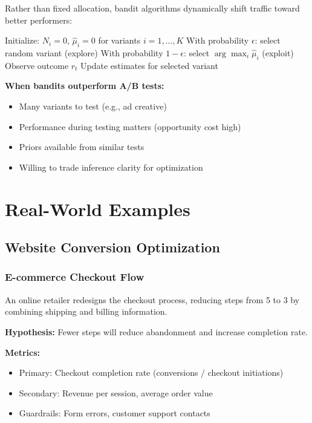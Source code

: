 Rather than fixed allocation, bandit algorithms dynamically shift traffic toward better performers:

\begin{algorithm}[H]
\caption{Simple $\epsilon$-Greedy Bandit}
\begin{algorithmic}
\STATE Initialize: $N_i = 0$, $\hat{\mu}_i = 0$ for variants $i = 1, \ldots, K$
    \STATE With probability $\epsilon$: select random variant (explore)
    \STATE With probability $1-\epsilon$: select $\arg\max_i \hat{\mu}_i$ (exploit)
    \STATE Observe outcome $r_t$
    \STATE Update estimates for selected variant
\ENDFOR
\end{algorithmic}
\end{algorithm}

\textbf{When bandits outperform A/B tests:}
\begin{itemize}
    \item Many variants to test (e.g., ad creative)
    \item Performance during testing matters (opportunity cost high)
    \item Priors available from similar tests
    \item Willing to trade inference clarity for optimization
\end{itemize}

\section{Real-World Examples}

\subsection{Website Conversion Optimization}

\subsubsection{E-commerce Checkout Flow}

An online retailer redesigns the checkout process, reducing steps from 5 to 3 by combining shipping and billing information.

\textbf{Hypothesis:} Fewer steps will reduce abandonment and increase completion rate.

\textbf{Metrics:}
\begin{itemize}
    \item Primary: Checkout completion rate (conversions / checkout initiations)
    \item Secondary: Revenue per session, average order value
    \item Guardrails: Form errors, customer support contacts
\end{itemize}


